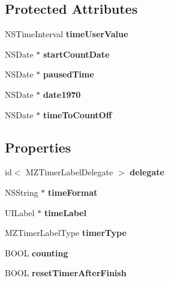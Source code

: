 \subsection*{Protected Attributes}
\begin{DoxyCompactItemize}
\item 
\mbox{\label{interface_m_z_timer_label_a4f44c8f935ccb7c36154128f8009a816}} 
N\+S\+Time\+Interval {\bfseries time\+User\+Value}
\item 
\mbox{\label{interface_m_z_timer_label_a5fb65d2f85012c65203ae5fe0a8519c6}} 
N\+S\+Date $\ast$ {\bfseries start\+Count\+Date}
\item 
\mbox{\label{interface_m_z_timer_label_a9c7c6c4d2f8a40487ee1d6dabcf13214}} 
N\+S\+Date $\ast$ {\bfseries paused\+Time}
\item 
\mbox{\label{interface_m_z_timer_label_a3459213d8abb6300710e503f5ae06b97}} 
N\+S\+Date $\ast$ {\bfseries date1970}
\item 
\mbox{\label{interface_m_z_timer_label_a200a2e46bfa5ecba006bff9d11ad119c}} 
N\+S\+Date $\ast$ {\bfseries time\+To\+Count\+Off}
\end{DoxyCompactItemize}
\subsection*{Properties}
\begin{DoxyCompactItemize}
\item 
\mbox{\label{interface_m_z_timer_label_a19d4b6a7ef9645120d1650d46372227c}} 
id$<$ M\+Z\+Timer\+Label\+Delegate $>$ {\bfseries delegate}
\item 
\mbox{\label{interface_m_z_timer_label_aace229f17e538a69f89a32b558d1d2c8}} 
N\+S\+String $\ast$ {\bfseries time\+Format}
\item 
\mbox{\label{interface_m_z_timer_label_ab482f542c8ca19782035d5b5b7f2cfef}} 
U\+I\+Label $\ast$ {\bfseries time\+Label}
\item 
\mbox{\label{interface_m_z_timer_label_a77428d20e7a5d798380c9b23a14f19b3}} 
M\+Z\+Timer\+Label\+Type {\bfseries timer\+Type}
\item 
\mbox{\label{interface_m_z_timer_label_aaed7e6d1140425b70471ffba98c656b3}} 
B\+O\+OL {\bfseries counting}
\item 
\mbox{\label{interface_m_z_timer_label_ac988182695a8af6efeede12a6a039b4a}} 
B\+O\+OL {\bfseries reset\+Timer\+After\+Finish}
\end{DoxyCompactItemize}



